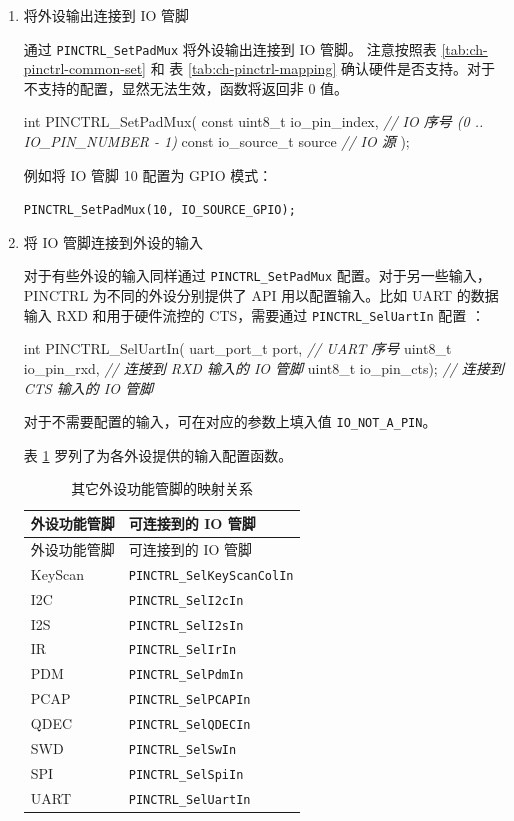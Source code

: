 \documentclass[
  12pt,
]{book}
\newenvironment{Shaded}{\begin{snugshade}}{\end{snugshade}}
\newcommand{\CommentTok}[1]{\textcolor[rgb]{0.56,0.35,0.01}{\textit{#1}}}
\newcommand{\DataTypeTok}[1]{\textcolor[rgb]{0.13,0.29,0.53}{#1}}
\newcommand{\NormalTok}[1]{#1}
\begin{document}
\begin{enumerate}
\def\labelenumi{\arabic{enumi}.}
\item
  将外设输出连接到 IO 管脚

  通过 \texttt{PINCTRL\_SetPadMux} 将外设输出连接到 IO 管脚。
  注意按照表 \ref{tab:ch-pinctrl-common-set} 和 表 \ref{tab:ch-pinctrl-mapping}
  确认硬件是否支持。对于不支持的配置，显然无法生效，函数将返回非 0 值。

\begin{Shaded}
\begin{Highlighting}[]
\DataTypeTok{int}\NormalTok{ PINCTRL_SetPadMux(}
  \DataTypeTok{const} \DataTypeTok{uint8_t}\NormalTok{ io_pin_index, }\CommentTok{// IO 序号 (0 .. IO_PIN_NUMBER - 1)}
  \DataTypeTok{const}\NormalTok{ io_source_t source    }\CommentTok{// IO 源}
\NormalTok{);}
\end{Highlighting}
\end{Shaded}

  例如将 IO 管脚 10 配置为 GPIO 模式：

  \texttt{PINCTRL\_SetPadMux(10,\ IO\_SOURCE\_GPIO);}
\item
  将 IO 管脚连接到外设的输入

  对于有些外设的输入同样通过 \texttt{PINCTRL\_SetPadMux} 配置。对于另一些输入，
  PINCTRL 为不同的外设分别提供了 API 用以配置输入。比如 UART 的数据输入 RXD 和用于硬件流控的
  CTS，需要通过 \texttt{PINCTRL\_SelUartIn} 配置 ：

\begin{Shaded}
\begin{Highlighting}[]
\DataTypeTok{int}\NormalTok{ PINCTRL_SelUartIn(}
\NormalTok{  uart_port_t port,     }\CommentTok{// UART 序号}
  \DataTypeTok{uint8_t}\NormalTok{ io_pin_rxd,   }\CommentTok{// 连接到 RXD 输入的 IO 管脚}
  \DataTypeTok{uint8_t}\NormalTok{ io_pin_cts);  }\CommentTok{// 连接到 CTS 输入的 IO 管脚}
\end{Highlighting}
\end{Shaded}

  对于不需要配置的输入，可在对应的参数上填入值 \texttt{IO\_NOT\_A\_PIN}。

  表 \ref{tab:ch-pinctrl-sel-in} 罗列了为各外设提供的输入配置函数。

  \begin{longtable}[]{@{}ll@{}}
  \caption{\label{tab:ch-pinctrl-sel-in} 其它外设功能管脚的映射关系}\tabularnewline
  \toprule
  外设功能管脚 & 可连接到的 IO 管脚\tabularnewline
  \midrule
  \endfirsthead
  \toprule
  外设功能管脚 & 可连接到的 IO 管脚\tabularnewline
  \midrule
  \endhead
  KeyScan & \texttt{PINCTRL\_SelKeyScanColIn}\tabularnewline
  I2C & \texttt{PINCTRL\_SelI2cIn}\tabularnewline
  I2S & \texttt{PINCTRL\_SelI2sIn}\tabularnewline
  IR & \texttt{PINCTRL\_SelIrIn}\tabularnewline
  PDM & \texttt{PINCTRL\_SelPdmIn}\tabularnewline
  PCAP & \texttt{PINCTRL\_SelPCAPIn}\tabularnewline
  QDEC & \texttt{PINCTRL\_SelQDECIn}\tabularnewline
  SWD & \texttt{PINCTRL\_SelSwIn}\tabularnewline
  SPI & \texttt{PINCTRL\_SelSpiIn}\tabularnewline
  UART & \texttt{PINCTRL\_SelUartIn}\tabularnewline
  \bottomrule
  \end{longtable}
\end{enumerate}
\end{document}
